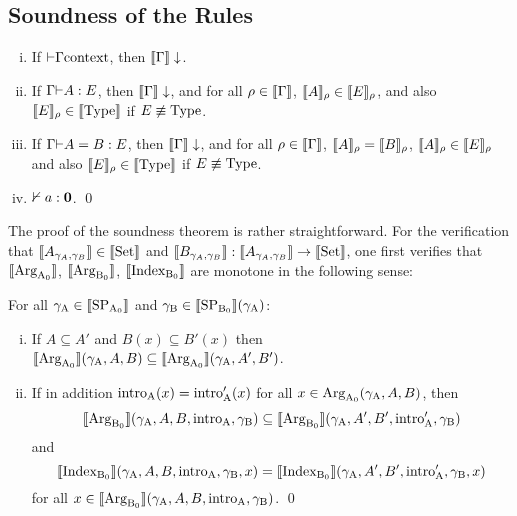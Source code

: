 \documentclass{article}
\begin{document}
\subsection{Soundness of the Rules}
\begin{theorem}[Soundness] \mbox{}
\label{thm:soundness}
  \begin{enumerate}[(i)]
  \item If ${} \tstile \Gamma \text{context}$, then
    $\sem{\Gamma}\downarrow$. 
  \item If $\Gamma \tstile A : E$, then $\sem{\Gamma}\downarrow$, and
    for all $\rho \in \sem{\Gamma}$, ${\sem{A}_\rho \in \sem{E}_\rho}$, and also
    $\sem{E}_\rho \in \sem{\TYPE}$ if $E \not\equiv \TYPE$.
  \item If $\Gamma \tstile A = B : E$, then $\sem{\Gamma}\downarrow$, and
    for all $\rho \in \sem{\Gamma}$, $\sem{A}_\rho = \sem{B}_\rho$,
    $\sem{A}_\rho \in \sem{E}_\rho$ and also $\sem{E}_\rho \in \sem{\TYPE}$ if
    $E \not\equiv \TYPE$. 
  \item $\nvdash a : \zero$. \qed
  \end{enumerate}
\end{theorem}
The proof of the soundness theorem is rather
  straight\-forward. For the verification that $\sem{A_{\gamma_A, \gamma_B}}
  \in \sem{\Set}$ and $\sem{B_{\gamma_A, \gamma_B}} : \sem{A_{\gamma_A,
      \gamma_B}} \to \sem{\Set}$, one first verifies that $\sem{\ArgAp}$,
  $\sem{\ArgBp}$, $\sem{\IndexBp}$ are monotone in the following sense:
  \begin{lemma}
  \label{thm:Arg-monotone}
  For all $\gammaA \in \sem{\SPAp}$ and $\gammaB \in \sem{\SPBp}(\gammaA)$:
  \begin{enumerate}[(i)]
  \item If $A \subseteq A'$ and $B(x) \subseteq B'(x)$ then
    $\sem{\ArgAp}(\gammaA, A, B) \subseteq \sem{\ArgAp}(\gammaA, A', B')$.
  \item If in addition $\introA(x) = \introA'(x)$ for all $x \in \ArgAp(\gammaA, A, B)$, then
    \[
    \sem{\ArgBp}(\gammaA, A, B, \introA, \gammaB) \subseteq \sem{\ArgBp}(\gammaA, A', B', \introA', \gammaB)
    \]
    and
    \[    
    \sem{\IndexBp}(\gammaA, A, B, \introA, \gammaB, x) = \sem{\IndexBp}(\gammaA, A', B', \introA', \gammaB, x)
    \]
    for all $x \in \sem{\ArgBp}(\gammaA, A, B, \introA, \gammaB)$. \qed
  \end{enumerate}
  \end{lemma}
\end{document}
